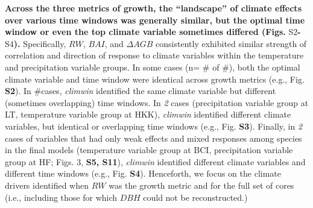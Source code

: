 \documentclass[
]{article}
\begin{document}
\textbf{Across the three metrics of growth, the ``landscape'' of climate
effects over various time windows was generally similar, but the optimal
time window or even the top climate variable sometimes differed (Figs.
}S2\textbf{-}S4\textbf{).} Specifically, \(RW\), \(BAI\), and
\(\Delta AGB\) consistently exhibited similar strength of correlation
and direction of response to climate variables within the temperature
and precipitation variable groups. In some cases (n= \# of \#), both the
optimal climate variable and time window were identical across growth
metrics (e.g., Fig. \textbf{S2}). In \#cases, \emph{climwin} identified
the same climate variable but different (sometimes overlapping) time
windows. In \emph{2} cases (precipitation variable group at LT,
temperature variable group at HKK), \emph{climwin} identified different
climate variables, but identical or overlapping time windows (e.g., Fig.
\textbf{S3}). Finally, in \emph{2} cases of variables that had only weak
effects and mixed responses among species in the final models
(temperature variable group at BCI, precipitation variable group at HF;
Figs. 3, \textbf{S5, S11}), \emph{climwin} identified different climate
variables and different time windows (e.g., Fig. \textbf{S4}).
Henceforth, we focus on the climate drivers identified when \(RW\) was
the growth metric and for the full set of cores (i.e., including those
for which \(DBH\) could not be reconstructed.)
\end{document}
